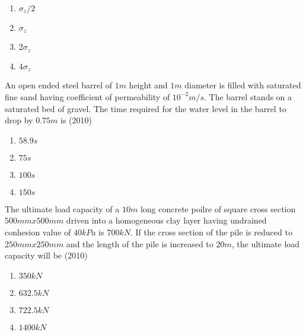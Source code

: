 		\begin{enumerate}
			\item $\sigma_{z} / 2$
			\item $\sigma_{z}$
			\item $2 \sigma_{z}$
			\item $4 \sigma_{z}$
        	\end{enumerate}	
	\item An open ended steel barrel of $1 m$ height and $1 m$ diameter is filled with saturated fine sand having coefficient of permeability of $10^{-2} m / s$. The barrel stands on a saturated bed of gravel. The time required for the water level in the barrel to drop by $0.75 m$ is
	\hfill{(2010)}
		\begin{enumerate}
			\item $58.9 s$
			\item $75 s$
			\item $100 s$
			\item $150 s$
        	\end{enumerate}	
	\item The ultimate load capacity of a $10m$ long concrete poilre of square cross section $500 mm x 500 mm $ driven into a homogeneous clay layer having undrained conhesion value of $40kPa$ is $700kN$. If the cross section of the pile is reduced to $250mm x 250mm$ and the length of the pile is increased to $20m $, the ultimate load capacity will be 
	\hfill{(2010)}
		\begin{enumerate}
			\item $350 kN$
			\item $632.5 kN$
			\item $722.5 kN$
			\item $1400 kN$
        	\end{enumerate}	

